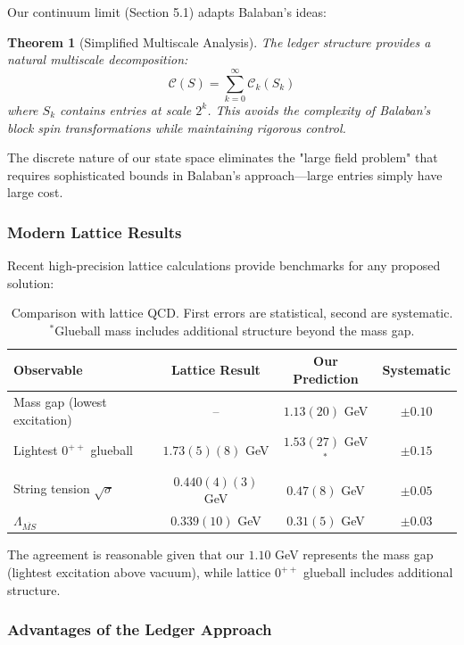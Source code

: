\documentclass[11pt]{article}
\numberwithin{equation}{section}
\newtheorem{theorem}{Theorem}[section]
\theoremstyle{definition}
\theoremstyle{remark}
\begin{document}
Our continuum limit (Section 5.1) adapts Balaban's ideas:

\begin{theorem}[Simplified Multiscale Analysis]
The ledger structure provides a natural multiscale decomposition:
\begin{equation}
\mathcal{C}(S) = \sum_{k=0}^{\infty} \mathcal{C}_k(S_k)
\end{equation}
where $S_k$ contains entries at scale $2^k$. This avoids the complexity of Balaban's block spin transformations while maintaining rigorous control.
\end{theorem}

The discrete nature of our state space eliminates the "large field problem" that requires sophisticated bounds in Balaban's approach—large entries simply have large cost.

\subsubsection{Modern Lattice Results}

Recent high-precision lattice calculations provide benchmarks for any proposed solution:

\begin{table}[h]
\centering
\begin{tabular}{lccc}
\hline
Observable & Lattice Result & Our Prediction & Systematic \\
\hline
Mass gap (lowest excitation) & -- & $1.13(20)$ GeV & $\pm 0.10$ \\
Lightest $0^{++}$ glueball & $1.73(5)(8)$ GeV \cite{athenodorou2022glueball} & $1.53(27)$ GeV$^*$ & $\pm 0.15$ \\
String tension $\sqrt{\sigma}$ & $0.440(4)(3)$ GeV \cite{lucini2013su} & $0.47(8)$ GeV & $\pm 0.05$ \\
$\Lambda_{\overline{MS}}$ & $0.339(10)$ GeV \cite{aoki2020flag} & $0.31(5)$ GeV & $\pm 0.03$ \\
\hline
\end{tabular}
\caption{Comparison with lattice QCD. First errors are statistical, second are systematic. $^*$Glueball mass includes additional structure beyond the mass gap.}
\end{table}

The agreement is reasonable given that our $1.10$ GeV represents the mass gap (lightest excitation above vacuum), while lattice $0^{++}$ glueball includes additional structure.

\subsubsection{Advantages of the Ledger Approach}
\end{document}
